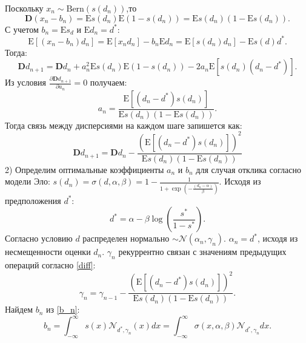 \documentclass{mipt-thesis-bs}
\begin{document}
Поскольку $x_n \sim \text{Bern}(s(d_n))$,то
\begin{equation}
    \mathbf{D}(x_n-b_n) = \mathrm{E} s(d_n) \mathrm{E} (1-s(d_n))=  \mathrm{E} s(d_n)  (1-\mathrm{E}s(d_n)).
\end{equation}
С учетом $b_n = \mathrm{E} s_d$ и $\mathrm{E} d_n =d^*$:
\begin{equation}
    \mathrm{E}\left[(x_n-b_n)d_n\right] = \mathrm{E}\left[x_n d_n \right] - b_n  \mathrm{E} d_n = \mathrm{E} \left[s(d_n) d_n\right] - \mathrm{E} s(d) d^*.
\end{equation}
Тогда:
\begin{equation}
    \mathbf{D} d_{n+1} = \mathbf{D} d_n + a_n^2 \mathrm{E}s(d_n)\mathrm{E}(1-s(d_n)) - 2 a_n \mathrm{E}\left[ s(d_n) (d_n-d^*)\right].
\end{equation}
Из условия $\frac{\partial \mathbf{D}{d_{n+1}}}{\partial a_n} =0 $ получаем:
\begin{equation}
    \label{diff}
    a_n = \frac{\mathrm{E} \left[ (d_n-d^*) s(d_n)\right]}{\mathrm{E}s(d_n)(1 - \mathrm{E}s(d_n))}.
\end{equation}
Тогда связь между дисперсиями на каждом шаге запишется как:
\begin{equation}
    \mathbf{D} d_{n+1} = \mathbf{D} d_n - \frac{\left(\mathrm{E} \left[ (d_n-d^*) s(d_n)\right] \right)^2}{\mathrm{E}s(d_n)(1 - \mathrm{E}s(d_n))} 
\end{equation}
2) Определим оптимальные коэффициенты $a_n$ и $b_n$ для случая отклика согласно модели Эло: $s(d_n) = \sigma(d,\alpha,\beta) = 1 - \frac{1}{1+\exp(-\frac{(d_n-\alpha)}{\beta})}$. Исходя из предположения $d^*$:
\begin{equation}
    d^* = \alpha  - \beta \log\left(\frac{s^*}{1-s^*}\right).
\end{equation}
Согласно условию $d$ распределен нормально $\sim \mathcal{N}(\alpha_n,\gamma_n)$. $\alpha_n = d^*$, исходя из несмещенности оценки $d_n$. $\gamma_n$ рекуррентно связан с значениям предыдущих операций согласно \ref{diff}:
\begin{equation}
    \label{gamma_connection}
    \gamma_n = \gamma_{n-1} - \frac{\left(\mathrm{E} \left[ (d_n-d^*) s(d_n)\right] \right)^2}{\mathrm{E}s(d_n)(1 - \mathrm{E}s(d_n))}.
\end{equation}
Найдем $b_n$ из \ref{b_n}:
\begin{equation}
    b_n = \int_{-\infty}^{\infty} s(x) \mathcal{N}_{d^*,\gamma_n}(x) d x = \int_{-\infty}^{\infty} \sigma(x,\alpha,\beta) \mathcal{N}_{d^*,\gamma_n} d x.
\end{equation}
\end{document}
